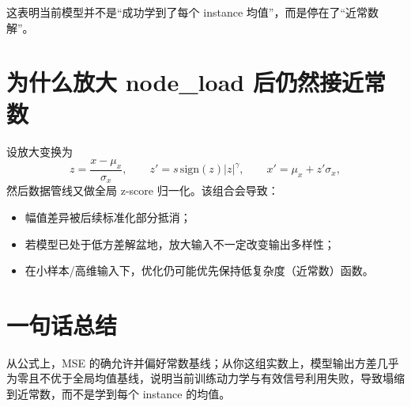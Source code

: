 \documentclass[11pt]{article}
\begin{document}
这表明当前模型并不是“成功学到了每个 instance 均值”，而是停在了“近常数解”。

\section{为什么放大 node\_load 后仍然接近常数}
设放大变换为
\[
z=\frac{x-\mu_x}{\sigma_x},\qquad z' = s\,\mathrm{sign}(z)|z|^{\gamma},\qquad x'=\mu_x+z'\sigma_x,
\]
然后数据管线又做全局 z-score 归一化。该组合会导致：
\begin{itemize}
  \item 幅值差异被后续标准化部分抵消；
  \item 若模型已处于低方差解盆地，放大输入不一定改变输出多样性；
  \item 在小样本/高维输入下，优化仍可能优先保持低复杂度（近常数）函数。
\end{itemize}

\section{一句话总结}
从公式上，MSE 的确允许并偏好常数基线；从你这组实数上，模型输出方差几乎为零且不优于全局均值基线，说明当前训练动力学与有效信号利用失败，导致塌缩到近常数，而不是学到每个 instance 的均值。
\end{document}
